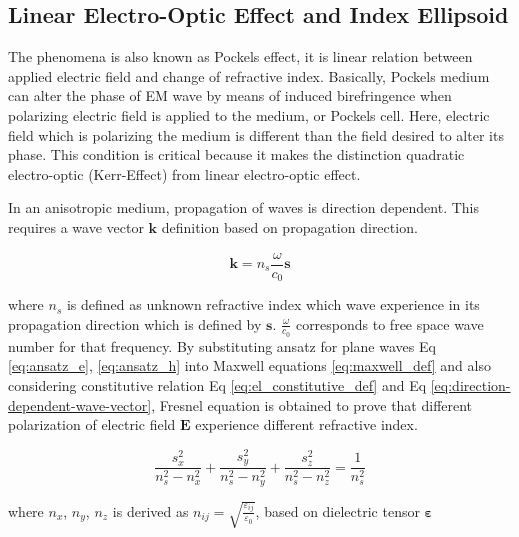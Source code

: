 \documentclass[thesis]{deutez}
\begin{document}
    \subsection{Linear Electro-Optic Effect and Index Ellipsoid}
    
    The phenomena is also known as Pockels effect, it is linear relation between applied electric field and change of refractive index. Basically, Pockels medium can alter the phase of EM wave by means of induced birefringence when polarizing electric field is applied to the medium, or Pockels cell. Here, electric field which is polarizing the medium is different than the field desired to alter its phase. This condition is critical because it makes the distinction quadratic electro-optic (Kerr-Effect) from linear electro-optic effect.
    
    In an anisotropic medium, propagation of waves is direction dependent. This requires a wave vector $\mathbf{k}$ definition based on propagation direction. 
    
    \begin{equation}
        \mathbf{k} = n_s \frac{\omega}{c_0} \mathbf{s}
        \label{eq:direction-dependent-wave-vector}
    \end{equation}  
    
    where $n_s$ is defined as unknown refractive index which wave experience in its propagation direction which is defined by $\mathbf{s}$. $\frac{\omega}{c_0}$ corresponds to free space wave number for that frequency. By substituting ansatz for plane waves Eq \ref{eq:ansatz_e}, \ref{eq:ansatz_h} into Maxwell equations \ref{eq:maxwell_def} and also considering constitutive relation Eq \ref{eq:el_constitutive_def} and Eq \ref{eq:direction-dependent-wave-vector}, Fresnel equation is obtained to prove that different polarization of electric field $\mathbf{E}$ experience different refractive index.

    \begin{equation}
        \frac{s_x^2}{n_s^2 - n_x^2} + \frac{s_y^2}{n_s^2 - n_y^2} + \frac{s_z^2}{n_s^2 - n_z^2} = \frac{1}{n_s^2}
        \label{eq:fresnel-eq}
    \end{equation} 

    where $n_x$, $n_y$, $n_z$ is derived as $n_{ij}=\sqrt{\frac{\varepsilon_{ij}}{\varepsilon_0}}$, based on dielectric tensor $\bm\varepsilon$
\end{document}
